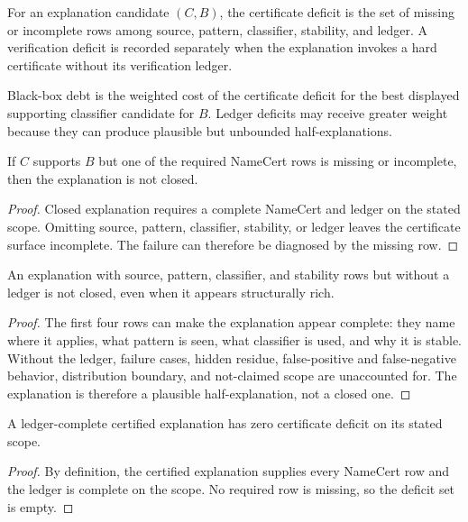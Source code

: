 \begin{definition}
\label{def:philosophy-certificate-deficit}
For an explanation candidate $(C,B)$, the certificate deficit is the set
of missing or incomplete rows among source, pattern, classifier,
stability, and ledger. A verification deficit is recorded separately
when the explanation invokes a hard certificate without its verification
ledger.
\end{definition}

\begin{definition}
\label{def:philosophy-black-box-debt}
Black-box debt is the weighted cost of the certificate deficit for the
best displayed supporting classifier candidate for $B$. Ledger deficits
may receive greater weight because they can produce plausible but
unbounded half-explanations.
\end{definition}

\begin{theorem}
\label{thm:philosophy-missing-namecert-rows-diagnose-black-boxes}
If $C$ supports $B$ but one of the required NameCert rows is missing or
incomplete, then the explanation is not closed.
\end{theorem}
\begin{proof}
Closed explanation requires a complete NameCert and ledger on the stated
scope. Omitting source, pattern, classifier, stability, or ledger leaves
the certificate surface incomplete. The failure can therefore be
diagnosed by the missing row.
\end{proof}

\begin{theorem}
\label{thm:philosophy-ledger-black-box-high-risk}
An explanation with source, pattern, classifier, and stability rows but
without a ledger is not closed, even when it appears structurally rich.
\end{theorem}
\begin{proof}
The first four rows can make the explanation appear complete: they name
where it applies, what pattern is seen, what classifier is used, and why
it is stable. Without the ledger, failure cases, hidden residue,
false-positive and false-negative behavior, distribution boundary, and
not-claimed scope are unaccounted for. The explanation is therefore a
plausible half-explanation, not a closed one.
\end{proof}

\begin{theorem}
\label{thm:philosophy-closed-explanations-zero-deficit}
A ledger-complete certified explanation has zero certificate deficit on
its stated scope.
\end{theorem}
\begin{proof}
By definition, the certified explanation supplies every NameCert row and
the ledger is complete on the scope. No required row is missing, so the
deficit set is empty.
\end{proof}

